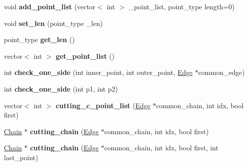 \begin{DoxyCompactItemize}
\item 
\mbox{\label{class_chain_a1373f56d1b4827e6a67f5ed98a3f0b26}} 
void {\bfseries add\+\_\+point\+\_\+list} (vector$<$ int $>$ \+\_\+point\+\_\+list, point\+\_\+type length=0)
\item 
\mbox{\label{class_chain_a414e5343132703472eed6cc802e3ca0e}} 
void {\bfseries set\+\_\+len} (point\+\_\+type \+\_\+len)
\item 
\mbox{\label{class_chain_af576db363dab1ccba4dc21c9794f80a3}} 
point\+\_\+type {\bfseries get\+\_\+len} ()
\item 
\mbox{\label{class_chain_a69bd850d9acd2aad6e51e35b4493bed5}} 
vector$<$ int $>$ {\bfseries get\+\_\+point\+\_\+list} ()
\item 
\mbox{\label{class_chain_aa955e4f5e525b2e55fb081f4482a1614}} 
int {\bfseries check\+\_\+one\+\_\+side} (int inner\+\_\+point, int outer\+\_\+point, \mbox{\hyperlink{class_edge}{Edge}} $\ast$common\+\_\+edge)
\item 
\mbox{\label{class_chain_a55272c1932f0e7fc690690c77155e0a6}} 
int {\bfseries check\+\_\+one\+\_\+side} (int p1, int p2)
\item 
\mbox{\label{class_chain_af707c3d1463d584c70ec518c28c597ae}} 
vector$<$ int $>$ {\bfseries cutting\+\_\+c\+\_\+point\+\_\+list} (\mbox{\hyperlink{class_edge}{Edge}} $\ast$common\+\_\+chain, int idx, bool first)
\item 
\mbox{\label{class_chain_ad94d51d8b5eba5875aab5d0a068692f3}} 
\mbox{\hyperlink{class_chain}{Chain}} $\ast$ {\bfseries cutting\+\_\+chain} (\mbox{\hyperlink{class_edge}{Edge}} $\ast$common\+\_\+chain, int idx, bool first)
\item 
\mbox{\label{class_chain_aa28b849a009781d89e7bd559f125b7b3}} 
\mbox{\hyperlink{class_chain}{Chain}} $\ast$ {\bfseries cutting\+\_\+chain} (\mbox{\hyperlink{class_edge}{Edge}} $\ast$common\+\_\+chain, int idx, bool first, int last\+\_\+point)
\item 
\mbox{\label{class_chain_ad7e54f56c15b8a7d29741c9349f9ce63}} 

\end{DoxyCompactItemize}
